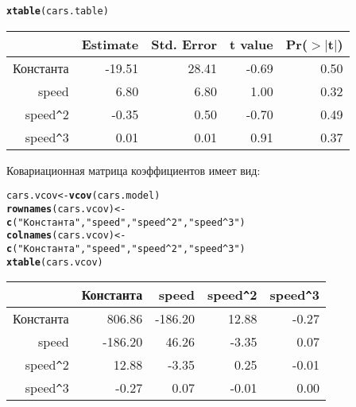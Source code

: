 \documentclass[pdftex,11pt,openany]{book}\usepackage[]{graphicx}\usepackage[]{color}
\makeatletter
\newcommand{\hlstr}[1]{\textcolor[rgb]{0.192,0.494,0.8}{#1}}%
\newcommand{\hlstd}[1]{\textcolor[rgb]{0.345,0.345,0.345}{#1}}%
\newcommand{\hlkwb}[1]{\textcolor[rgb]{0.69,0.353,0.396}{#1}}%
\newcommand{\hlkwd}[1]{\textcolor[rgb]{0.737,0.353,0.396}{\textbf{#1}}}%
\newenvironment{kframe}{%
 \def\at@end@of@kframe{}%
 \ifinner\ifhmode%
  \def\at@end@of@kframe{\end{minipage}}%
  \begin{minipage}{\columnwidth}%
 \fi\fi%
 \def\FrameCommand##1{\hskip\@totalleftmargin \hskip-\fboxsep
 \colorbox{shadecolor}{##1}\hskip-\fboxsep
     \hskip-\linewidth \hskip-\@totalleftmargin \hskip\columnwidth}%
 \MakeFramed {\advance\hsize-\width
   \@totalleftmargin\z@ \linewidth\hsize
   \@setminipage}}%
 {\par\unskip\endMakeFramed%
 \at@end@of@kframe}
\makeatother
\begin{document}
\begin{problem}
\begin{kframe}
\begin{alltt}
\hlkwd{xtable}\hlstd{(cars.table)}
\end{alltt}
\end{kframe}%
\begin{table}[ht]
\centering
\begin{tabular}{rrrrr}
  \hline
 & Estimate & Std. Error & t value & Pr($>$$|$t$|$) \\ 
  \hline
Константа & -19.51 & 28.41 & -0.69 & 0.50 \\ 
  speed & 6.80 & 6.80 & 1.00 & 0.32 \\ 
  speed\verb|^|2 & -0.35 & 0.50 & -0.70 & 0.49 \\ 
  speed\verb|^|3 & 0.01 & 0.01 & 0.91 & 0.37 \\ 
   \hline
\end{tabular}
\end{table}


Ковариационная матрица коэффициентов имеет вид:
\begin{kframe}
\begin{alltt}
\hlstd{cars.vcov} \hlkwb{<-} \hlkwd{vcov}\hlstd{(cars.model)}
\hlkwd{rownames}\hlstd{(cars.vcov)} \hlkwb{<-}
  \hlkwd{c}\hlstd{(}\hlstr{"Константа"}\hlstd{,}\hlstr{"speed"}\hlstd{,}\hlstr{"speed^2"}\hlstd{,}\hlstr{"speed^3"}\hlstd{)}
\hlkwd{colnames}\hlstd{(cars.vcov)} \hlkwb{<-}
  \hlkwd{c}\hlstd{(}\hlstr{"Константа"}\hlstd{,}\hlstr{"speed"}\hlstd{,}\hlstr{"speed^2"}\hlstd{,}\hlstr{"speed^3"}\hlstd{)}
\hlkwd{xtable}\hlstd{(cars.vcov)}
\end{alltt}
\end{kframe}%
\begin{table}[ht]
\centering
\begin{tabular}{rrrrr}
  \hline
 & Константа & speed & speed\verb|^|2 & speed\verb|^|3 \\ 
  \hline
Константа & 806.86 & -186.20 & 12.88 & -0.27 \\ 
  speed & -186.20 & 46.26 & -3.35 & 0.07 \\ 
  speed\verb|^|2 & 12.88 & -3.35 & 0.25 & -0.01 \\ 
  speed\verb|^|3 & -0.27 & 0.07 & -0.01 & 0.00 \\ 
   \hline
\end{tabular}
\end{table}



\end{problem}
\end{document}
